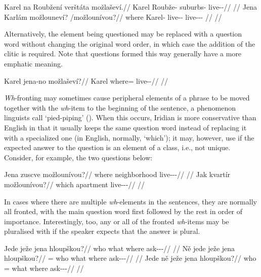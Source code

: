 \pex
\a\begingl
\gla Karel na Roubžení verštáta možlaševí.//
\glb Karel \Loc{} Roubže-\Gen{} suburbs-\Acc{} live-\Av{}-\Cont{}//
\glft {}//
\endgl
\a\begingl
\gla Jena Karlám možlouneví? /možlounívou?//
\glb where Karel-\Agt{} live-\Lv{}-\Cont{} live-\Lv{}-\Cont{}-\Nz{} //
\glft {}//
\endgl
\xe

Alternatively, the element being questioned may be replaced with a question word without changing the original word order, in which case the addition of the clitic  is required. Note that questions formed this way generally have a more emphatic meaning.

\pex
\begingl
\gla Karel jena-no možlaševí?//
\glb Karel where=\Q{} live-\Av{}-\Cont{}//
\glft {}//
\endgl
\xe


\emph{Wh}-fronting may sometimes cause peripheral elements of a phrase to be moved together with the \emph{wh}-item to the beginning of the sentence, a phenomenon linguists call `pied-piping' (\cite[263-4]{ross1967}). When this occurs, Iridian is more conservative than English in that it usually keeps the same question word instead of replacing it with a specialized one (in English, normally, `which'); it may, however, use  if the expected answer to the question is an element of a class, i.e., not unique. Consider, for example, the two questions below:

\pex
\a
\begingl
\gla Jena zuscve možlounívou?//
\glb where neighborhood live-\Lv{}-\Cont{}-\Nz{}//
\glft {}//
\endgl
\a
\begingl
\gla Jak kvartír možlounívou?//
\glb which apartment live-\Lv{}-\Cont{}-\Nz{}//
\glft {}//
\endgl
\xe

In cases where there are multiple \emph{wh}-elements in the sentences, they are normally all fronted, with the main question word first followed by the rest in order of importance. Interestingly, too, any or all of the fronted \emph{wh}-items may be pluralised with  if the speaker expects that the answer is plural.

\pex
\a\begingl
\gla Jede ježe jena hloupškou?//
\glb who what where ask-\Av{}-\Pf{}-\Nz{}//
\glft {}//
\endgl
\a\begingl
\gla Ně jede ježe jena hloupškou?//
\glb \Pl{}= who what where ask-\Av{}-\Pf{}-\Nz{}//
\glft {}//
\endgl
\a\begingl
\gla Jede ně ježe jena hloupškou?//
\glb who \Pl{}= what where ask-\Av{}-\Pf{}-\Nz{}//
\glft {}//
\endgl
\xe

